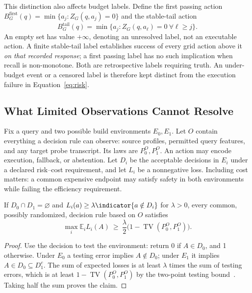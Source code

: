 This distinction also affects budget labels. Define the first passing action $B_G^{\mathrm{first}}(q)=\min\{a_j:Z_G(q,a_j)=0\}$ and the stable-tail action
\begin{equation}
 B_G^{\mathrm{tail}}(q)=\min\{a_j:Z_G(q,a_\ell)=0\ \forall\ell\ge j\}.
 \label{eq:stable-label}
\end{equation}
An empty set has value $+\infty$, denoting an unresolved label, not an executable action. A finite stable-tail label establishes success of every grid action above it \emph{on that recorded response}; a first passing label has no such implication when recall is non-monotone. Both are retrospective labels requiring truth. An under-budget event or a censored label is therefore kept distinct from the execution failure in Equation~\eqref{eq:risk}.

\subsection{What Limited Observations Cannot Resolve}
\label{sec:information-limit}

Fix a query and two possible build environments $E_0,E_1$. Let $O$ contain everything a decision rule can observe: source profiles, permitted query features, and any target probe transcript. Its laws are $P_0^O,P_1^O$. An action may encode execution, fallback, or abstention. Let $D_i$ be the acceptable decisions in $E_i$ under a declared risk--cost requirement, and let $L_i$ be a nonnegative loss. Including cost matters: a common expensive endpoint may satisfy safety in both environments while failing the efficiency requirement.

\begin{proposition}
\label{prop:information}
If $D_0\cap D_1=\varnothing$ and $L_i(a)\ge\lambda\indicator\{a\notin D_i\}$ for $\lambda>0$, every common, possibly randomized, decision rule based on $O$ satisfies
\begin{equation}
 \max_i\mathbb{E}_i L_i(A)\ \ge\
 \frac{\lambda}{2}\bigl(1-\operatorname{TV}(P_0^O,P_1^O)\bigr).
 \label{eq:information}
\end{equation}
\end{proposition}
\begin{proof}
Use the decision to test the environment: return 0 if $A\in D_0$, and 1 otherwise. Under $E_0$ a testing error implies $A\notin D_0$; under $E_1$ it implies $A\in D_0\subseteq D_1^c$. The sum of expected losses is at least $\lambda$ times the sum of testing errors, which is at least $1-\operatorname{TV}(P_0^O,P_1^O)$ by the two-point testing bound~\cite{yu1997assouad}. Taking half the sum proves the claim.
\end{proof}

